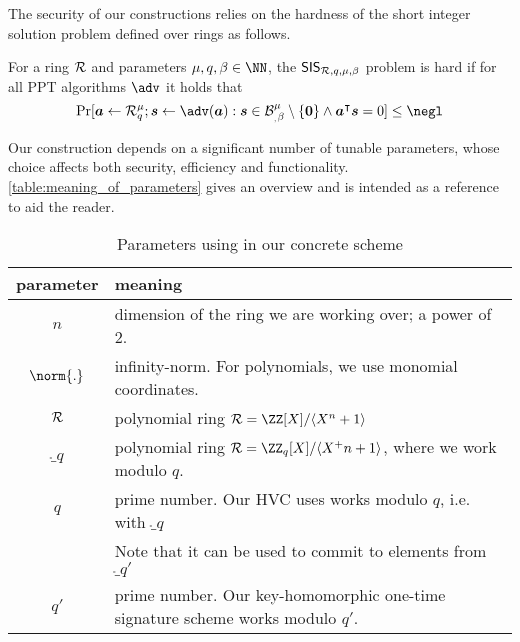 The security of our constructions relies on the hardness of the short integer solution problem defined over rings as follows.
\begin{definition}
  For a ring $\mathcal{R}$ and parameters $\mu,q,\beta \in \NN$, the $\mathsf{SIS}_{\mathcal{R},q,\mu,\beta}$ problem is hard if for all PPT algorithms $\adv$ it holds that
  \[
    \Pr[
      \vec{a} \gets \ring_q^\mu; \vec{s}\gets\adv(\vec{a}) : \vec{s}\in\ball_\beta^\mu\setminus\{\vec{0}\} \land \vec{a}^\transpose\vec{s}=0
    ] \leq \negl
  \]
\end{definition}

Our construction depends on a significant number of tunable parameters, whose choice affects both security, efficiency and functionality. \autoref{table:meaning_of_parameters} gives an overview and is intended as a reference to aid the reader.

\begin{table}
\centering
\begin{tabular}{c@{\hskip 2ex}l}
 parameter & meaning\\\toprule
 $n$ & dimension of the ring we are working over; a power of 2.\\
 $\norm{.}$ & infinity-norm. For polynomials, we use monomial coordinates.\\
 $\mathcal{R}$ & polynomial ring $\ring = \ZZ[X]/\langle X^n + 1\rangle$\\
 $\ring_q$ & polynomial ring $\ring = \ZZ_q[X]/\langle X^+n + 1\rangle$, where we work modulo $q$.\\
 $q$ & prime number. Our HVC uses works modulo $q$, i.e. with $\ring_q$ \\
  & Note that it can be used to commit to elements from $\ring_{q'}$\\
 $q'$ & prime number. Our key-homomorphic one-time signature scheme works modulo $q'$.\\
\end{tabular}

 
\label{table:meaning_of_parameters}
 \caption{Parameters using in our concrete scheme}
\end{table}
